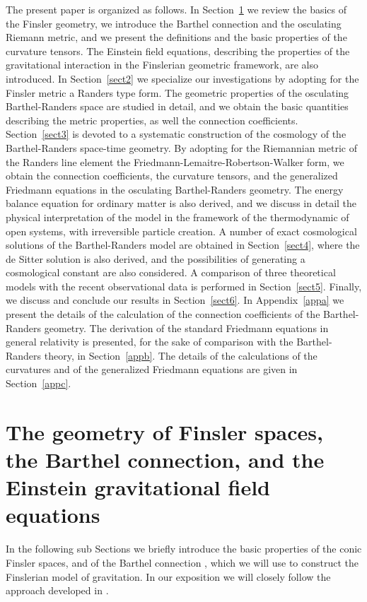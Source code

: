 \documentclass[aps,superscriptaddress, showpacs,preprintnumbers, superscriptaddress, nofootinbibt,twocolumn]{revtex4-2}
\begin{document}
The present paper is organized as follows. In Section~\ref{sect1} we review the basics of the Finsler geometry, we introduce the Barthel connection and the osculating Riemann metric, and we present the definitions and the basic properties of the curvature tensors. The Einstein field equations, describing the properties of the gravitational interaction in the Finslerian geometric framework, are also introduced. In Section~\ref{sect2} we specialize our investigations by adopting for the Finsler metric a Randers type form. The geometric properties of the osculating Barthel-Randers space are studied in detail, and we obtain the basic quantities describing the metric properties, as well the connection coefficients.   Section~\ref{sect3} is devoted to a systematic construction of the cosmology of the Barthel-Randers space-time geometry. By adopting for the Riemannian metric of the Randers line element the Friedmann-Lemaitre-Robertson-Walker form, we obtain the connection coefficients, the curvature tensors, and the generalized Friedmann equations in the osculating Barthel-Randers geometry. The energy balance equation for ordinary matter is also derived, and we discuss in detail the physical interpretation of the model in the framework of the thermodynamic of open systems, with irreversible particle creation.  A number of exact cosmological solutions of the Barthel-Randers model are obtained in Section~\ref{sect4}, where the de Sitter solution is also derived, and the possibilities of generating a cosmological constant are also considered. A comparison of three theoretical models with the recent observational data is performed in Section~\ref{sect5}. Finally, we discuss and conclude our results in Section~\ref{sect6}.  In Appendix~\ref{appa} we present the details of the calculation of the connection coefficients of the Barthel-Randers geometry.  The derivation of the standard Friedmann equations in general relativity is presented, for the sake of comparison with the Barthel-Randers theory, in Section~\ref{appb}. The details of the calculations of the curvatures and of the generalized Friedmann equations are given in Section~\ref{appc}.


\section{The geometry of Finsler spaces, the Barthel connection, and
the Einstein gravitational field equations}\label{sect1}

In the following sub Sections we briefly introduce the basic properties of the conic Finsler spaces, and of the Barthel connection \cite{Bar1,Bar2,Ing0}, which we will use to construct the Finslerian model of gravitation. In our exposition  we will closely follow the approach developed in  \cite{Ing1,Ing2}.
\end{document}
